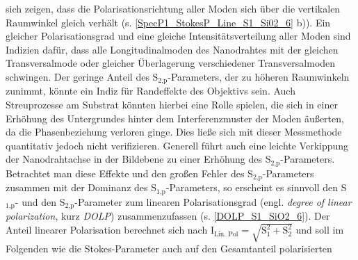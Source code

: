 sich zeigen, dass die Polarisationsrichtung aller Moden sich über die vertikalen
Raumwinkel gleich verhält (s. \autoref{SpecP1_StokesP_Line_S1_Si02_6} b)). Ein
gleicher Polarisationsgrad und eine gleiche Intensitätsverteilung aller Moden
sind Indizien dafür, dass alle Longitudinalmoden des Nanodrahtes mit der
gleichen Transversalmode oder gleicher Überlagerung verschiedener
Transversalmoden schwingen. Der geringe Anteil des S$_\text{2,p}$-Parameters,
der zu höheren Raumwinkeln zunimmt, könnte ein Indiz für Randeffekte des
Objektivs sein. Auch Streuprozesse am Substrat könnten hierbei eine Rolle
spielen, die sich in einer Erhöhung des Untergrundes hinter dem
Interferenzmuster der Moden äußerten, da die Phasenbeziehung verloren ginge.
Dies ließe sich mit dieser Messmethode quantitativ jedoch nicht verifizieren.
Generell führt auch eine leichte Verkippung der Nanodrahtachse in der Bildebene
zu einer Erhöhung des S$_\text{2,p}$-Parameters.\\ Betrachtet man diese Effekte
und den großen Fehler des S$_\text{2,p}$-Parameters zusammen mit der Dominanz
des S$_\text{1,p}$-Parameters, so erscheint es sinnvoll den S$_\text{1,p}$- und
den S$_\text{2,p}$-Parameter zum linearen Polarisationsgrad (engl.
\textit{degree of linear polarization}, kurz \textit{DOLP}) zusammenzufassen (s.
\autoref{DOLP_S1_SiO2_6}). Der Anteil linearer Polarisation berechnet sich nach
$\text{I}_\text{Lin.
Pol}=\sqrt{\text{S}_\text{1}^\text{2}+\text{S}_\text{2}^\text{2}}$ und soll im
Folgenden wie die Stokes-Parameter auch auf den Gesamtanteil polarisierten
